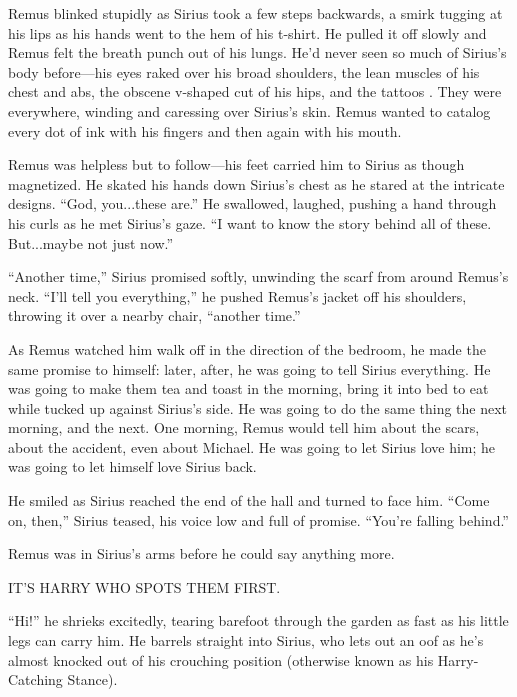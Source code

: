 Remus blinked stupidly as Sirius took a few steps backwards, a smirk tugging at his lips as his hands went to the hem of his t-shirt. He pulled it off slowly and Remus felt the breath punch out of his lungs. He’d never seen so much of Sirius’s body before—his eyes raked over his broad shoulders, the lean muscles of his chest and abs, the obscene v-shaped cut of his hips, and the tattoos . They were everywhere, winding and caressing over Sirius’s skin. Remus wanted to catalog every dot of ink with his fingers and then again with his mouth.

Remus was helpless but to follow—his feet carried him to Sirius as though magnetized. He skated his hands down Sirius’s chest as he stared at the intricate designs. “God, you...these are.” He swallowed, laughed, pushing a hand through his curls as he met Sirius’s gaze. “I want to know the story behind all of these. But...maybe not just now.”

“Another time,” Sirius promised softly, unwinding the scarf from around Remus’s neck. “I’ll tell you everything,” he pushed Remus’s jacket off his shoulders, throwing it over a nearby chair, “another time.”

As Remus watched him walk off in the direction of the bedroom, he made the same promise to himself: later, after, he was going to tell Sirius everything. He was going to make them tea and toast in the morning, bring it into bed to eat while tucked up against Sirius’s side. He was going to do the same thing the next morning, and the next. One morning, Remus would tell him about the scars, about the accident, even about Michael. He was going to let Sirius love him; he was going to let himself love Sirius back.

He smiled as Sirius reached the end of the hall and turned to face him. “Come on, then,” Sirius teased, his voice low and full of promise. “You’re falling behind.”

Remus was in Sirius’s arms before he could say anything more.

\newpage


IT’S HARRY WHO SPOTS THEM FIRST.

“Hi!” he shrieks excitedly, tearing barefoot through the garden as fast as his little legs can carry him. He barrels straight into Sirius, who lets out an oof as he’s almost knocked out of his crouching position (otherwise known as his Harry-Catching Stance).

